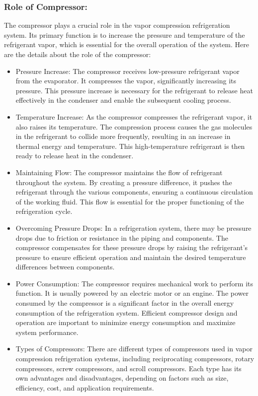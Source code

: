 \documentclass{article}
\begin{document}
\subsubsection*{Role of Compressor:}
The compressor plays a crucial role in the vapor compression refrigeration system. Its primary function is to increase the pressure and temperature of the refrigerant vapor, which is essential for the overall operation of the system. Here are the details about the role of the compressor:

\begin{itemize}
  \item Pressure Increase: The compressor receives low-pressure refrigerant vapor from the evaporator. It compresses the vapor, significantly increasing its pressure. This pressure increase is necessary for the refrigerant to release heat effectively in the condenser and enable the subsequent cooling process.
  \item Temperature Increase: As the compressor compresses the refrigerant vapor, it also raises its temperature. The compression process causes the gas molecules in the refrigerant to collide more frequently, resulting in an increase in thermal energy and temperature. This high-temperature refrigerant is then ready to release heat in the condenser.
  \item Maintaining Flow: The compressor maintains the flow of refrigerant throughout the system. By creating a pressure difference, it pushes the refrigerant through the various components, ensuring a continuous circulation of the working fluid. This flow is essential for the proper functioning of the refrigeration cycle.
  \item Overcoming Pressure Drops: In a refrigeration system, there may be pressure drops due to friction or resistance in the piping and components. The compressor compensates for these pressure drops by raising the refrigerant's pressure to ensure efficient operation and maintain the desired temperature differences between components.
  \item Power Consumption: The compressor requires mechanical work to perform its function. It is usually powered by an electric motor or an engine. The power consumed by the compressor is a significant factor in the overall energy consumption of the refrigeration system. Efficient compressor design and operation are important to minimize energy consumption and maximize system performance.
  \item Types of Compressors: There are different types of compressors used in vapor compression refrigeration systems, including reciprocating compressors, rotary compressors, screw compressors, and scroll compressors. Each type has its own advantages and disadvantages, depending on factors such as size, efficiency, cost, and application requirements.
\end{itemize}
\end{document}
